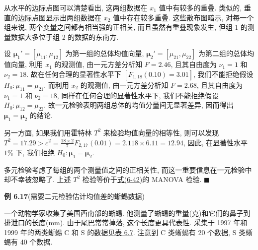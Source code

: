从水平的边际点图可以清楚看出, 这两组数据在 $x_1$ 值中有较多的重叠. 类似的, 垂直的边际点图显示出两组数据在 $x_2$ 值中存在较多重叠. 这些散布图暗示, 对每一个组来说, 两个变量之间都有相当强的正相关, 而且虽然有重叠现象发生, 但组 1 的测量数据大多位于组 2 的数据的东南方.

设 $\boldsymbol{\mu}_1'=[\mu_{11},\mu_{12}]$ 为第一组的总体均值向量, $\boldsymbol{\mu}_2'=[\mu_{21},\mu_{22}]$ 为第二组的总体均值向量, 利用 $x_1$ 的观测值, 由一元方差分析知 $F=2.46$, 且其自由度为 $\nu_1=1$ 和 $\nu_2=18$. 故在任何合理的显著性水平下 $[F_{1,18}(0.10)=3.01]$, 我们不能拒绝假设 $H_0:\mu_{11}=\mu_{21}$. 而利用 $x_2$ 的观测值, 由一元方差分析知 $F=2.68$, 且其自由度为 $\nu_1=1$ 和 $\nu_2=18$, 同样在任何合理的显著性水平下, 我们不能拒绝假设 $H_0:\mu_{12}=\mu_{22}$. 故一元检验表明两组总体的均值分量间无显著差异, 因而得出 $\boldsymbol{\mu}_1=\boldsymbol{\mu}_2$ 的结论.

另一方面, 如果我们用霍特林 $T^2$ 来检验均值向量的相等性, 则可以发现 $T^2=17.29>c^2=\frac{18\times 2}{7}F_{2,17}(0.01)=2.118\times 6.11=12.94$, 因此, 在显著性水平 $1\%$ 下, 我们拒绝 $H_0:\boldsymbol{\mu}_1=\boldsymbol{\mu}_2$.

多元检验考虑了每组的两个测量值之间的正相关性, 而这一重要信息在一元检验中却不幸被忽略了. 上述 $T^2$ 检验等价于\hyperref[eq:6-42]{式(6-42)}的 MANOVA 检验. \hfill$\blacksquare$

\noindent\textbf{例 6.17}\quad (需要二元检验估计均值差的蜥蜴数据)

一个动物学家收集了美国西南部的蜥蜴. 他测量了蜥蜴的重量(克)和它们的鼻子到排泄口的长度(mm). 由于尾巴常常掉落, 这个长度更具代表性. 采集于 1997 年和 1999 年的两类蜥蜴 C 和 S 的数据见\hyperref[tab:6.7]{表 6.7}. 注意到 C 类蜥蜴有 20 个数据, S 类蜥蜴有 40 个数据.

